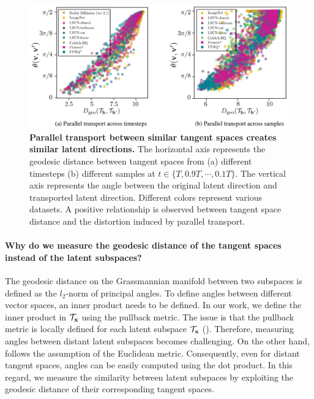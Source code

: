 \begin{figure}[!t]
\centering
    \includegraphics[width=0.95\linewidth]{figure/parallel_transport_x_theta_long.pdf}
    \vspace{-0.5em}
    \caption{
    \textbf{Parallel transport between similar tangent spaces creates similar latent directions.} 
    The horizontal axis represents the geodesic distance between tangent spaces from (a) different timesteps (b) different samples at $t \in \{T, 0.9T, \cdots, 0.1T\}$. The vertical axis represents the angle between the original latent direction and transported latent direction. 
    Different colors represent various datasets. 
    A positive relationship is observed between tangent space distance and the distortion induced by parallel transport.
    }
    \label{fig:parallel_transport_x_theta}
\end{figure}

\paragraph{Why do we measure the geodesic distance of the tangent spaces instead of the latent subspaces?}
\label{appendixsec:relationship_tangent_latent}
The geodesic distance on the Grassmannian manifold between two subspaces is defined as the $l_{2}$-norm of principal angles. 
To define angles between different vector spaces, an inner product needs to be defined. In our work, we define the inner product in $\mathcal{T}_{\mathbf{x}}$ using the pullback metric. The issue is that the pullback metric is locally defined for each latent subspace $\mathcal{T}_{\mathbf{x}}$ (). Therefore, measuring angles between distant latent subspaces becomes challenging. On the other hand, \ehspace{} follows the assumption of the Euclidean metric. Consequently, even for distant tangent spaces, angles can be easily computed using the dot product.
In this regard, we measure the similarity between latent subspaces by exploiting the geodesic distance of their corresponding tangent spaces.

